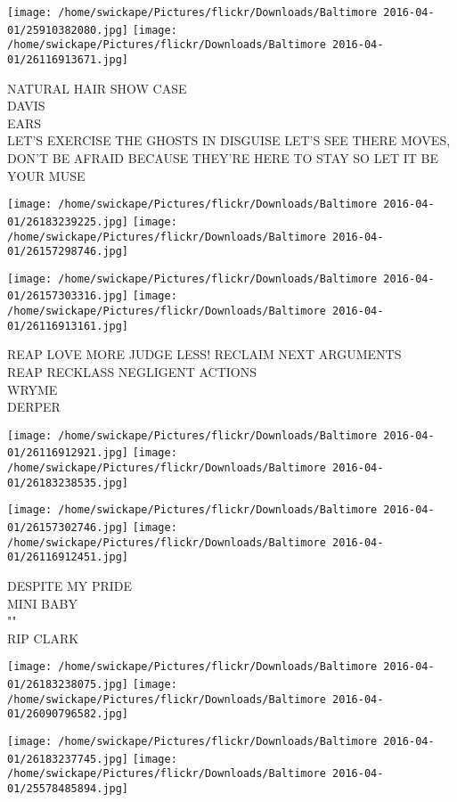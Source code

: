 \documentclass[10pt,letterpaper]{article}
\begin{document}
\texttt{[image: /home/swickape/Pictures/flickr/Downloads/Baltimore 2016-04-01/25910382080.jpg]}
\texttt{[image: /home/swickape/Pictures/flickr/Downloads/Baltimore 2016-04-01/26116913671.jpg]}

NATURAL HAIR SHOW CASE\\
DAVIS\\
EARS\\
LET'S EXERCISE THE GHOSTS IN DISGUISE LET'S SEE THERE MOVES, DON'T BE AFRAID BECAUSE THEY'RE HERE TO STAY SO LET IT BE YOUR MUSE
\pagebreak

\texttt{[image: /home/swickape/Pictures/flickr/Downloads/Baltimore 2016-04-01/26183239225.jpg]}
\texttt{[image: /home/swickape/Pictures/flickr/Downloads/Baltimore 2016-04-01/26157298746.jpg]}

\texttt{[image: /home/swickape/Pictures/flickr/Downloads/Baltimore 2016-04-01/26157303316.jpg]}
\texttt{[image: /home/swickape/Pictures/flickr/Downloads/Baltimore 2016-04-01/26116913161.jpg]}

REAP LOVE MORE JUDGE LESS! RECLAIM NEXT ARGUMENTS\\
REAP RECKLASS NEGLIGENT ACTIONS\\
WRYME\\
DERPER
\pagebreak

\texttt{[image: /home/swickape/Pictures/flickr/Downloads/Baltimore 2016-04-01/26116912921.jpg]}
\texttt{[image: /home/swickape/Pictures/flickr/Downloads/Baltimore 2016-04-01/26183238535.jpg]}

\texttt{[image: /home/swickape/Pictures/flickr/Downloads/Baltimore 2016-04-01/26157302746.jpg]}
\texttt{[image: /home/swickape/Pictures/flickr/Downloads/Baltimore 2016-04-01/26116912451.jpg]}

DESPITE MY PRIDE\\
MINI BABY\\
""\\
RIP CLARK
\pagebreak

\texttt{[image: /home/swickape/Pictures/flickr/Downloads/Baltimore 2016-04-01/26183238075.jpg]}
\texttt{[image: /home/swickape/Pictures/flickr/Downloads/Baltimore 2016-04-01/26090796582.jpg]}

\texttt{[image: /home/swickape/Pictures/flickr/Downloads/Baltimore 2016-04-01/26183237745.jpg]}
\texttt{[image: /home/swickape/Pictures/flickr/Downloads/Baltimore 2016-04-01/25578485894.jpg]}
\end{document}
